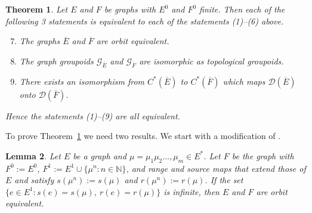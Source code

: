 \documentclass[12pt, a4paper]{amsart}
\numberwithin{equation}{section}
\newtheorem{thm}{Theorem}[section]
\newtheorem{lemma}[thm]{Lemma}
\theoremstyle{definition}
\theoremstyle{remark}
\begin{document}
\begin{thm}\label{thm:amplified}
	Let $E$ and $F$ be graphs with $E^0$ and $F^0$ finite. Then each of the following 3 statements is equivalent to each of the statements (1)--(6) above.
	\begin{enumerate}
		\setcounter{enumi}{6}
		\item The graphs $\overline{E}$ and $\overline{F}$ are orbit equivalent.
		\item The graph groupoids $\mathcal{G}_{\overline{E}}$ and $\mathcal{G}_{\overline{F}}$ are isomorphic as topological groupoids.
		\item There exists an isomorphism from $C^*(\overline{E})$ to $C^*(\overline{F})$ which maps $\mathcal{D}(\overline{E})$ onto $\mathcal{D}(\overline{F})$.
	\end{enumerate}
	Hence the statements (1)--(9) are all equivalent.
\end{thm}

To prove Theorem~\ref{thm:amplified} we need two results. We start with a 
modification of 
\cite[Theorem 3.8]{ERS}.

\begin{lemma}\label{lem:ext}
	Let $E$ be a graph and $\mu=\mu_1\mu_2\dots,\mu_m\in E^*$. Let $F$ be the graph with $F^0:=E^0$, $F^1:=E^1\cup\{\mu^n:n\in{\mathbb{N}}\}$, and range and source maps that extend those of $E$ and satisfy $s(\mu^n):=s(\mu)$ and $r(\mu^n):=r(\mu)$. If the set $\{e\in E^1: s(e)=s(\mu),\ r(e)=r(\mu)\}$ is infinite, then $E$ and $F$ are orbit equivalent.
\end{lemma}
\end{document}

